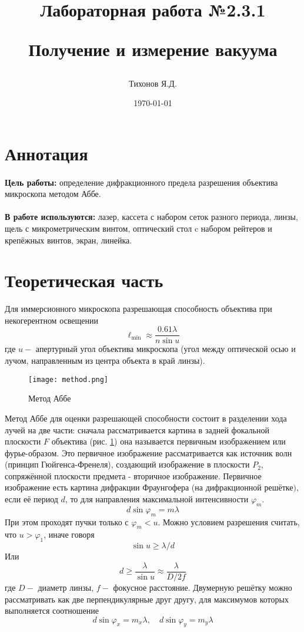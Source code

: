 \documentclass{article}
\title{\begin{center}Лабораторная работа №2.3.1\end{center}
Получение и измерение вакуума}
\author{Тихонов Я.Д.}
\date{\today}
\begin{document}
    \maketitle

\section{Аннотация}

    \paragraph{}
    \textbf{Цель работы:} определение дифракционного предела разрешения объектива микроскопа методом Аббе.

    \paragraph{}
    \textbf{В работе используются:} лазер, кассета с набором сеток разного периода, линзы, щель с микрометрическим винтом, оптический стол c набором рейтеров и крепёжных винтов, экран, линейка.

\section{Теоретическая часть}
 Для иммерсионного микроскопа разрешающая способность объектива при некогерентном
освещении
$$
\ell_{\min } \approx \frac{0.61 \lambda}{n \sin u}
$$
где $u-$ апертурный угол объектива микроскопа (угол между оптической осью и лучом, направленным из центра объекта в край линзы).

\begin{figure}[h]
    \centering
    \texttt{[image: method.png]}
    \caption{Метод Аббе}
    \label{method}
\end{figure}

Метод Аббе для оценки разрешающей способности состоит в разделении хода лучей на две части: сначала рассматривается картина в задней фокальной плоскости $F$ объектива (рис. \ref{method}) она называется первичным изображением или фурье-образом. Это первичное изображение рассматривается как источник волн (принцип Гюйгенса-Френеля), создающий изображение в плоскости $P_{2}$, сопряжённой плоскости предмета - вторичное изображение. Первичное изображение есть картина дифракции Фраунгофера (на дифракционной решётке$),$ если её период $d$, то для направления максимальной интенсивности $\varphi_{m}$.
$$
d \sin \varphi_{m}=m \lambda
$$
При этом проходят пучки только с $\varphi_{m}<u .$ Можно условием разрешения считать, что $u>\varphi_{1}$, иначе говоря
$$
\sin u \geq \lambda / d
$$
Или
$$
d \geq \frac{\lambda}{\sin u} \approx \frac{\lambda}{D / 2 f}
$$
где $D-$ диаметр линзы, $f-$ фокусное расстояние. Двумерную решётку можно рассматривать как две перпендикулярные друг другу, для максимумов которых выполняется соотношение
$$
d \sin \varphi_{x}=m_{x} \lambda, \quad d \sin \varphi_{y}=m_{y} \lambda
$$
\end{document}
